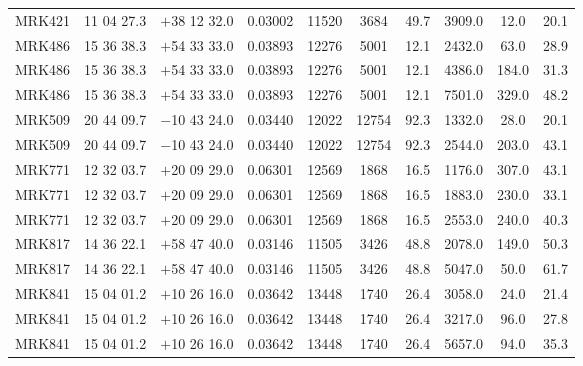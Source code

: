 \begin{landscape}
\begin{center}
\begin{longtable}{l c c c c c c c c c}
MRK421  &                  11 04 27.3  &         $+$38 12 32.0  &       0.03002  & 11520  &   3684  &       49.7  &      3909.0  &  12.0  &   20.1  \\
MRK486  &                  15 36 38.3  &         $+$54 33 33.0  &       0.03893  & 12276  &   5001  &       12.1  &      2432.0  &  63.0  &   28.9  \\
MRK486  &                  15 36 38.3  &         $+$54 33 33.0  &       0.03893  & 12276  &   5001  &       12.1  &      4386.0  &  184.0  &  31.3  \\
MRK486  &                  15 36 38.3  &         $+$54 33 33.0  &       0.03893  & 12276  &   5001  &       12.1  &      7501.0  &  329.0  &  48.2  \\
MRK509  &                  20 44 09.7  &         $-$10 43 24.0  &       0.03440  & 12022  &   12754  &      92.3  &      1332.0  &  28.0  &   20.1  \\
MRK509  &                  20 44 09.7  &         $-$10 43 24.0  &       0.03440  & 12022  &   12754  &      92.3  &      2544.0  &  203.0  &  43.1  \\
MRK771  &                  12 32 03.7  &         $+$20 09 29.0  &       0.06301  & 12569  &   1868  &       16.5  &      1176.0  &  307.0  &  43.1  \\
MRK771  &                  12 32 03.7  &         $+$20 09 29.0  &       0.06301  & 12569  &   1868  &       16.5  &      1883.0  &  230.0  &  33.1  \\
MRK771  &                  12 32 03.7  &         $+$20 09 29.0  &       0.06301  & 12569  &   1868  &       16.5  &      2553.0  &  240.0  &  40.3  \\
MRK817  &                  14 36 22.1  &         $+$58 47 40.0  &       0.03146  & 11505  &   3426  &       48.8  &      2078.0  &  149.0  &  50.3  \\
MRK817  &                  14 36 22.1  &         $+$58 47 40.0  &       0.03146  & 11505  &   3426  &       48.8  &      5047.0  &  50.0  &   61.7  \\
MRK841  &                  15 04 01.2  &         $+$10 26 16.0  &       0.03642  & 13448  &   1740  &       26.4  &      3058.0  &  24.0  &   21.4  \\
MRK841  &                  15 04 01.2  &         $+$10 26 16.0  &       0.03642  & 13448  &   1740  &       26.4  &      3217.0  &  96.0  &   27.8  \\
MRK841  &                  15 04 01.2  &         $+$10 26 16.0  &       0.03642  & 13448  &   1740  &       26.4  &      5657.0  &  94.0  &   35.3  \\

\end{longtable}
\end{center}
\end{landscape}
